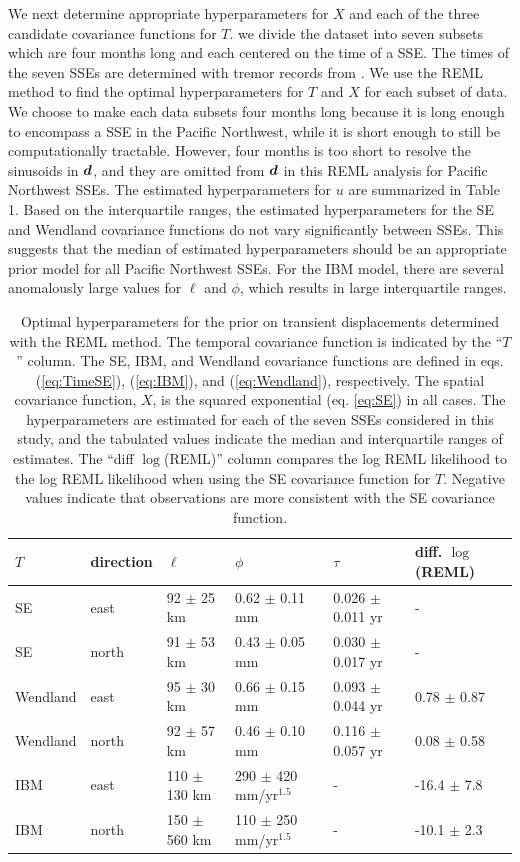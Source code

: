 \documentclass[extra,mreferee]{gji}
\begin{document}
We next determine appropriate hyperparameters for $X$ and each of the
three candidate covariance functions for $T$. we divide the dataset
into seven subsets which are four months long and each centered on the
time of a SSE. The times of the seven SSEs are determined with tremor
records from \cite{Wech2010}. We use the REML method to find the
optimal hyperparameters for $T$ and $X$ for each subset of data. We
choose to make each data subsets four months long because it is long
enough to encompass a SSE in the Pacific Northwest, while it is short
enough to still be computationally tractable. However, four months is
too short to resolve the sinusoids in $\data$, and they are omitted
from $\data$ in this REML analysis for Pacific Northwest SSEs. The
estimated hyperparameters for $u$ are summarized in Table 1. Based on
the interquartile ranges, the estimated hyperparameters for the SE and
Wendland covariance functions do not vary significantly between SSEs.
This suggests that the median of estimated hyperparameters should be
an appropriate prior model for all Pacific Northwest SSEs. For the IBM
model, there are several anomalously large values for $\ell$ and
$\phi$, which results in large interquartile ranges.

\begin{table}\label{tab:Parameters}
\caption{
Optimal hyperparameters for the prior on transient displacements
determined with the REML method. The temporal covariance function is
indicated by the ``$T$'' column. The SE, IBM, and Wendland covariance
functions are defined in eqs. (\ref{eq:TimeSE}), (\ref{eq:IBM}), and
(\ref{eq:Wendland}), respectively. The spatial covariance function,
$X$, is the squared exponential (eq. \ref{eq:SE}) in all cases. The
hyperparameters are estimated for each of the seven SSEs considered in
this study, and the tabulated values indicate the median and
interquartile ranges of estimates. The ``diff $\log$(REML)'' column
compares the log REML likelihood to the log REML likelihood when using
the SE covariance function for $T$. Negative values indicate that
observations are more consistent with the SE covariance function.
} 
\begin{tabular} {l l l l l l}
$T$ & direction & $\ell$  & $\phi$   & $\tau$  & diff. $\log$(REML) \\ \hline
SE & east   & 92 $\pm$ 25 km  & 0.62 $\pm$ 0.11 mm  & 0.026 $\pm$ 0.011 yr  &  - \\
SE & north  & 91 $\pm$ 53 km  & 0.43 $\pm$ 0.05 mm  & 0.030 $\pm$ 0.017 yr  &  - \\
Wendland & east   & 95 $\pm$ 30 km  & 0.66 $\pm$ 0.15 mm  & 0.093 $\pm$ 0.044 yr &  0.78 $\pm$ 0.87 \\
Wendland & north  & 92 $\pm$ 57 km  & 0.46 $\pm$ 0.10 mm  & 0.116 $\pm$ 0.057 yr &  0.08 $\pm$ 0.58 \\
IBM & east   & 110 $\pm$ 130 km & 290 $\pm$ 420 mm/yr$^{1.5}$  & -          & -16.4 $\pm$ 7.8 \\
IBM & north  & 150 $\pm$ 560 km & 110 $\pm$ 250 mm/yr$^{1.5}$ & -           & -10.1 $\pm$ 2.3 \\
\end{tabular}
\end{table}
\end{document}

